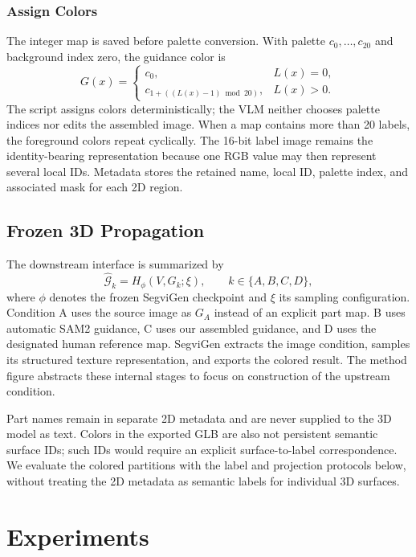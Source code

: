 \documentclass[pdflatex,iicol,sn-apa]{sn-jnl}
\begin{document}
\subsubsection{Assign Colors}
The integer map is saved before palette conversion. With palette $c_0,\ldots,c_{20}$ and background index zero, the guidance color is
\begin{equation}
G(x)=
\begin{cases}
c_0,&L(x)=0,\\
c_{1+((L(x)-1)\bmod20)},&L(x)>0.
\end{cases}
\label{eq:palette}
\end{equation}
The script assigns colors deterministically; the VLM neither chooses palette indices nor edits the assembled image. When a map contains more than 20 labels, the foreground colors repeat cyclically. The 16-bit label image remains the identity-bearing representation because one RGB value may then represent several local IDs. Metadata stores the retained name, local ID, palette index, and associated mask for each 2D region.

\subsection{Frozen 3D Propagation}
The downstream interface is summarized by
\begin{equation}
\widehat{\mathcal G}_k=H_{\phi}(V,G_k;\xi),
\qquad k\in\{A,B,C,D\},
\label{eq:downstream}
\end{equation}
where $\phi$ denotes the frozen SegviGen checkpoint and $\xi$ its sampling configuration. Condition A uses the source image as $G_A$ instead of an explicit part map. B uses automatic SAM2 guidance, C uses our assembled guidance, and D uses the designated human reference map. SegviGen extracts the image condition, samples its structured texture representation, and exports the colored result. The method figure abstracts these internal stages to focus on construction of the upstream condition.

Part names remain in separate 2D metadata and are never supplied to the 3D model as text. Colors in the exported GLB are also not persistent semantic surface IDs; such IDs would require an explicit surface-to-label correspondence. We evaluate the colored partitions with the label and projection protocols below, without treating the 2D metadata as semantic labels for individual 3D surfaces.

\section{Experiments}
\label{sec:experiments}
\end{document}
